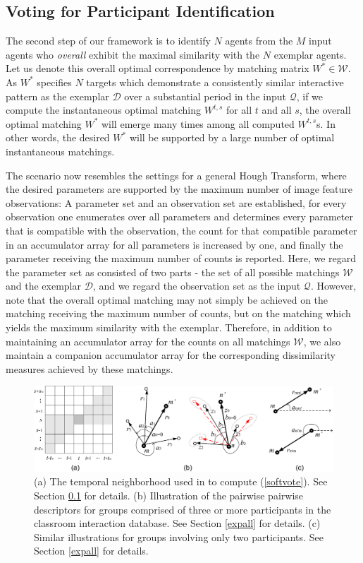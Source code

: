 \subsection{Voting for Participant Identification}
\label{vote}

The second step of our framework is to identify $N$ agents from the $M$ input agents who \emph{overall} exhibit the maximal similarity with the $N$ exemplar agents. Let us denote this overall optimal correspondence by matching matrix $W^{*}\in\mathcal{W}$.  As $W^{*}$ specifies $N$ targets which demonstrate a consistently similar interactive pattern as the exemplar $\mathcal{D}$ over a substantial period in the input $\mathcal{Q}$, if we compute the instantaneous optimal matching $W^{t,s}$ for all $t$ and all $s$, the overall optimal matching $W^{*}$ will emerge many times among all computed $W^{t,s}$s. In other words, the desired $W^{*}$ will be supported by a large number of optimal instantaneous matchings. 

The scenario now resembles the settings for a general Hough Transform, where the desired parameters are supported by the maximum number of image feature observations: A parameter set and an observation set are established, for every observation one enumerates over all parameters and determines every parameter that is compatible with the observation, the count for that compatible parameter in an accumulator array for all parameters is increased by one, and finally the parameter receiving the maximum number of counts is reported. Here, we regard the parameter set as consisted of two parts - the set of all possible matchings $\mathcal{W}$ and the exemplar $\mathcal{D}$, and we regard the observation set as the input $\mathcal{Q}$. However, note that the overall optimal matching may not simply be achieved on the matching receiving the maximum number of counts, but on the matching which yields the maximum similarity with the exemplar. Therefore, in addition to maintaining an accumulator array for the counts on all matchings $\mathcal{W}$, we also maintain a companion accumulator array for the corresponding dissimilarity measures achieved by these matchings. 

\begin{figure}[t]
\begin{center}
\includegraphics[scale=1.2]{all_illu.png}
\end{center}
\caption{(a) The temporal neighborhood used in to compute (\ref{softvote}). See Section \ref{vote} for details. (b) Illustration of the pairwise pairwise descriptors for groups comprised of three or more participants in the classroom interaction database. See Section \ref{expall} for details. (c) Similar illustrations for groups involving only two participants. See Section \ref{expall} for details.}
\label{all_illu}
\end{figure}

